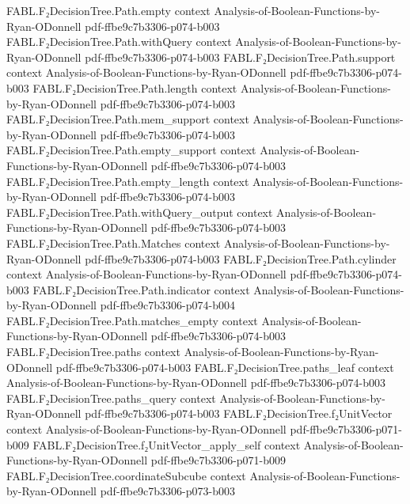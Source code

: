 \begin{theorem}
\proofstep
  {FABL.F₂DecisionTree.Path.empty}
  {context}
  {Analysis-of-Boolean-Functions-by-Ryan-ODonnell}
  {pdf-ffbe9c7b3306-p074-b003}
\proofstep
  {FABL.F₂DecisionTree.Path.withQuery}
  {context}
  {Analysis-of-Boolean-Functions-by-Ryan-ODonnell}
  {pdf-ffbe9c7b3306-p074-b003}
\proofstep
  {FABL.F₂DecisionTree.Path.support}
  {context}
  {Analysis-of-Boolean-Functions-by-Ryan-ODonnell}
  {pdf-ffbe9c7b3306-p074-b003}
\proofstep
  {FABL.F₂DecisionTree.Path.length}
  {context}
  {Analysis-of-Boolean-Functions-by-Ryan-ODonnell}
  {pdf-ffbe9c7b3306-p074-b003}
\proofstep
  {FABL.F₂DecisionTree.Path.mem_support}
  {context}
  {Analysis-of-Boolean-Functions-by-Ryan-ODonnell}
  {pdf-ffbe9c7b3306-p074-b003}
\proofstep
  {FABL.F₂DecisionTree.Path.empty_support}
  {context}
  {Analysis-of-Boolean-Functions-by-Ryan-ODonnell}
  {pdf-ffbe9c7b3306-p074-b003}
\proofstep
  {FABL.F₂DecisionTree.Path.empty_length}
  {context}
  {Analysis-of-Boolean-Functions-by-Ryan-ODonnell}
  {pdf-ffbe9c7b3306-p074-b003}
\proofstep
  {FABL.F₂DecisionTree.Path.withQuery_output}
  {context}
  {Analysis-of-Boolean-Functions-by-Ryan-ODonnell}
  {pdf-ffbe9c7b3306-p074-b003}
\proofstep
  {FABL.F₂DecisionTree.Path.Matches}
  {context}
  {Analysis-of-Boolean-Functions-by-Ryan-ODonnell}
  {pdf-ffbe9c7b3306-p074-b003}
\proofstep
  {FABL.F₂DecisionTree.Path.cylinder}
  {context}
  {Analysis-of-Boolean-Functions-by-Ryan-ODonnell}
  {pdf-ffbe9c7b3306-p074-b003}
\proofstep
  {FABL.F₂DecisionTree.Path.indicator}
  {context}
  {Analysis-of-Boolean-Functions-by-Ryan-ODonnell}
  {pdf-ffbe9c7b3306-p074-b004}
\proofstep
  {FABL.F₂DecisionTree.Path.matches_empty}
  {context}
  {Analysis-of-Boolean-Functions-by-Ryan-ODonnell}
  {pdf-ffbe9c7b3306-p074-b003}
\proofstep
  {FABL.F₂DecisionTree.paths}
  {context}
  {Analysis-of-Boolean-Functions-by-Ryan-ODonnell}
  {pdf-ffbe9c7b3306-p074-b003}
\proofstep
  {FABL.F₂DecisionTree.paths_leaf}
  {context}
  {Analysis-of-Boolean-Functions-by-Ryan-ODonnell}
  {pdf-ffbe9c7b3306-p074-b003}
\proofstep
  {FABL.F₂DecisionTree.paths_query}
  {context}
  {Analysis-of-Boolean-Functions-by-Ryan-ODonnell}
  {pdf-ffbe9c7b3306-p074-b003}
\proofstep
  {FABL.F₂DecisionTree.f₂UnitVector}
  {context}
  {Analysis-of-Boolean-Functions-by-Ryan-ODonnell}
  {pdf-ffbe9c7b3306-p071-b009}
\proofstep
  {FABL.F₂DecisionTree.f₂UnitVector_apply_self}
  {context}
  {Analysis-of-Boolean-Functions-by-Ryan-ODonnell}
  {pdf-ffbe9c7b3306-p071-b009}
\proofstep
  {FABL.F₂DecisionTree.coordinateSubcube}
  {context}
  {Analysis-of-Boolean-Functions-by-Ryan-ODonnell}
  {pdf-ffbe9c7b3306-p073-b003}
\proofstep

\end{theorem}
